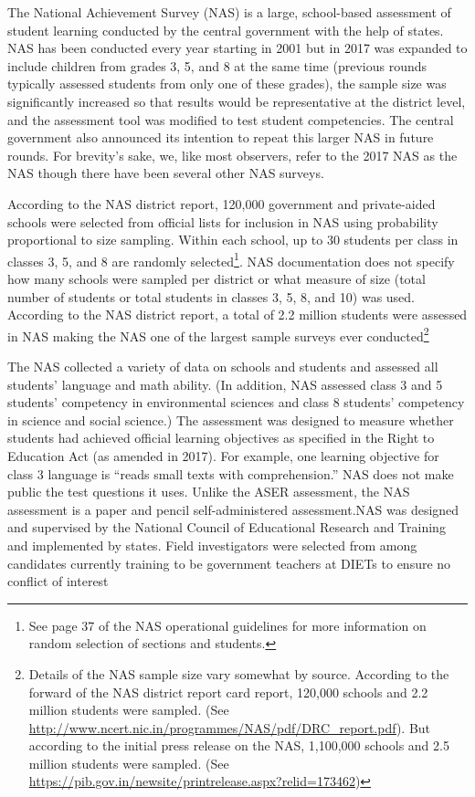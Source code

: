 \documentclass[
  11pt,
]{article}
\begin{document}
The National Achievement Survey (NAS) is a large, school-based assessment of student learning conducted by the central government with the help of states. NAS has been conducted every year starting in 2001 but in 2017 was expanded to include children from grades 3, 5, and 8 at the same time (previous rounds typically assessed students from only one of these grades), the sample size was significantly increased so that results would be representative at the district level, and the assessment tool was modified to test student competencies. The central government also announced its intention to repeat this larger NAS in future rounds. For brevity's sake, we, like most observers, refer to the 2017 NAS as the NAS though there have been several other NAS surveys.

According to the NAS district report, 120,000 government and private-aided schools were selected from official lists for inclusion in NAS using probability proportional to size sampling. Within each school, up to 30 students per class in classes 3, 5, and 8 are randomly selected\footnote{See page 37 of the NAS operational guidelines for more information on random selection of sections and students.}. NAS documentation does not specify how many schools were sampled per district or what measure of size (total number of students or total students in classes 3, 5, 8, and 10) was used. According to the NAS district report, a total of 2.2 million students were assessed in NAS making the NAS one of the largest sample surveys ever conducted\footnote{Details of the NAS sample size vary somewhat by source. According to the forward of the NAS district report card report, 120,000 schools and 2.2 million students were sampled. (See \url{http://www.ncert.nic.in/programmes/NAS/pdf/DRC_report.pdf}). But according to the initial press release on the NAS, 1,100,000 schools and 2.5 million students were sampled. (See \url{https://pib.gov.in/newsite/printrelease.aspx?relid=173462})}

The NAS collected a variety of data on schools and students and assessed all students' language and math ability. (In addition, NAS assessed class 3 and 5 students' competency in environmental sciences and class 8 students' competency in science and social science.) The assessment was designed to measure whether students had achieved official learning objectives as specified in the Right to Education Act (as amended in 2017). For example, one learning objective for class 3 language is ``reads small texts with comprehension.'' NAS does not make public the test questions it uses. Unlike the ASER assessment, the NAS assessment is a paper and pencil self-administered assessment.NAS was designed and supervised by the National Council of Educational Research and Training and implemented by states. Field investigators were selected from among candidates currently training to be government teachers at DIETs to ensure no conflict of interest
\end{document}
